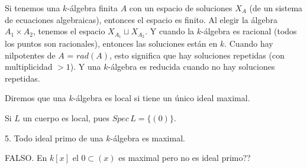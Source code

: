 Si tenemos una $k$-\'algebra finita $A$ con un espacio de soluciones $X_A$ (de un sistema de ecuaciones algebraicas), entonces el espacio es finito. Al elegir la \'algebra $A_1 \times A_2$, tenemos el espacio $X_{A_1} \sqcup X_{A_2}$. Y cuando la $k$-\'algebra es racional (todos los puntos son racionales), entonces las soluciones est\'an en $k$. Cuando hay nilpotentes de $A$ = $rad(A)$, esto significa que hay soluciones repetidas (con multiplicidad $>1$). Y una $k$-\'algebra es reducida cuando no hay soluciones repetidas.  

\begin{defi}
    Diremos que una $k$-\'algebra es local si tiene un \'unico ideal maximal.
\end{defi}
\begin{ejem}
    Si $L$ un cuerpo es local, pues $Spec\, L = \{(0)\}$. 
\end{ejem}
\begin{ejer} 5. Todo ideal primo de una $k$-\'algebra es maximal.
\end{ejer} 
\begin{dem}
    FALSO. En $k[x]$ el $0\subset (x)$ es maximal pero no es ideal primo?? 
\end{dem}
